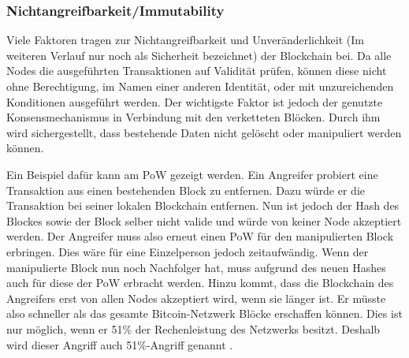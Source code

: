 
\subsubsection{Nichtangreifbarkeit/Immutability}
\label{subsec:immutability}
Viele Faktoren tragen zur Nichtangreifbarkeit und Unveränderlichkeit (Im weiteren Verlauf nur noch als Sicherheit bezeichnet) der Blockchain bei. Da alle Nodes die ausgeführten Transaktionen auf Validität prüfen, können diese nicht ohne Berechtigung, im Namen einer anderen Identität, oder mit unzureichenden Konditionen ausgeführt werden. Der wichtigste Faktor ist jedoch der genutzte Konsensmechanismus in Verbindung mit den verketteten Blöcken. Durch ihm wird sichergestellt, dass bestehende Daten nicht gelöscht oder manipuliert werden können.

Ein Beispiel dafür kann am PoW gezeigt werden. Ein Angreifer probiert eine Transaktion aus einen bestehenden Block zu entfernen. Dazu würde er die Transaktion bei seiner lokalen Blockchain entfernen. Nun ist jedoch der Hash des Blockes sowie der Block selber nicht valide und würde von keiner Node akzeptiert werden. Der Angreifer muss also erneut einen PoW für den manipulierten Block erbringen. Dies wäre für eine Einzelperson jedoch zeitaufwändig. Wenn der manipulierte Block nun noch Nachfolger hat, muss aufgrund des neuen Hashes auch für diese der PoW erbracht werden. Hinzu kommt, dass die Blockchain des Angreifers erst von allen Nodes akzeptiert wird, wenn sie länger ist. Er müsste also schneller als das gesamte Bitcoin-Netzwerk Blöcke erschaffen können. Dies ist nur möglich, wenn er 51\% der Rechenleistung des Netzwerks besitzt. Deshalb wird dieser Angriff auch 51\%-Angriff genannt \cite{SwanBlockchainblueprintnew2015} \cite{EthereumTeamEthereumWhitePaper2017}. 

